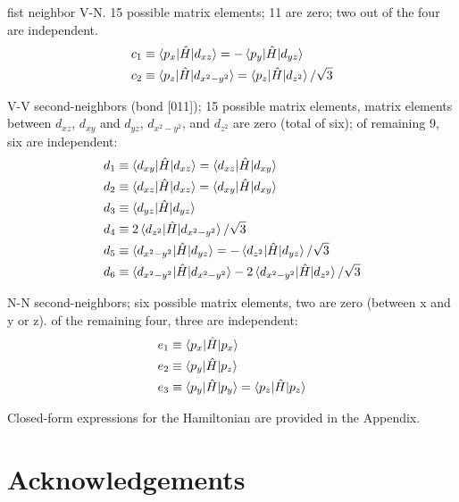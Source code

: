 \documentclass[twocolumn,showpacs,preprintnumbers,superscriptaddress,prb,floatfix,aps,10pt]{revtex4-1}
\newcommand*{\ham}{\hat{H}}
\begin{document}
fist neighbor V-N. 15 possible matrix elements; 11 are zero; two out of the four are independent.
%
\begin{align}
\begin{split}
c_1 & \equiv \braket{p_{x}|\ham|d_{xz}} = -\braket{p_{y}|\ham|d_{yz}} \\
c_2 & \equiv \braket{p_{z}|\ham|d_{x^2-y^2}} = \braket{p_{z}|\ham|d_{z^2}}/\sqrt{3} 
\end{split}
\end{align}

V-V second-neighbors (bond [011]); 15 possible matrix elements, matrix elements between $d_{xz}$, $d_{xy}$ and $d_{yz}$, $d_{x^2-y^2}$, and $d_{z^2}$ are zero (total of six); of remaining 9, six are independent:
%
\begin{align}
\begin{split}
d_1 & \equiv \braket{d_{xy}|\ham|d_{xz}} = \braket{d_{xz}|\ham|d_{xy}} \\
d_2 & \equiv \braket{d_{xz}|\ham|d_{xz}} = \braket{d_{xy}|\ham|d_{xy}} \\
d_3 & \equiv \braket{d_{yz}|\ham|d_{yz}} \\
d_4 & \equiv 2\braket{d_{z^2}|\ham|d_{x^2-y^2}}/\sqrt{3} \\
d_5 & \equiv \braket{d_{x^2-y^2}|\ham|d_{yz}} = -\braket{d_{z^2}|\ham|d_{yz}}/\sqrt{3} \\
d_6 & \equiv \braket{d_{x^2-y^2}|\ham|d_{x^2-y^2}} - 2\braket{d_{x^2-y^2}|\ham|d_{z^2}}/\sqrt{3}
\end{split}
\end{align}


N-N second-neighbors; six possible matrix elements, two are zero (between x and y or z). of the remaining four, three are independent:
%
\begin{align}
\begin{split}
e_1 & \equiv \braket{p_{x}|\ham|p_{x}} \\
e_2 & \equiv \braket{p_{y}|\ham|p_{z}} \\
e_3 & \equiv \braket{p_{y}|\ham|p_{y}} = \braket{p_{z}|\ham|p_{z}} \\
\end{split}
\end{align}

Closed-form expressions for the Hamiltonian are provided in the Appendix.

\section{Acknowledgements}
\end{document}
